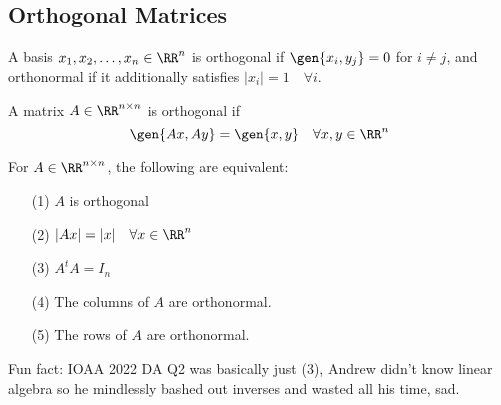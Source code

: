 \subsection{Orthogonal Matrices}

\begin{definition}

A basis $x_1, x_2, \hdots, x_n\in \RR^n$ is \ac{orthogonal} if $\gen{x_i, y_j} = 0$ for $i\neq j$, and \ac{orthonormal} if it additionally satisfies $\vert x_i\vert = 1\quad \forall i$. 
\end{definition}

\begin{definition}

A matrix $A\in \RR^{n\times n}$ is \ac{orthogonal} if 
\[\gen{Ax, Ay} = \gen{x,y}\quad \forall x,y\in \RR^n\]
\end{definition}

\begin{theorem}
\thmlabel

For $A\in \RR^{n\times n}$, the following are equivalent: 
\begin{itemize}
    \item [(1)] $A$ is orthogonal
    \item [(2)] $\vert Ax\vert = \vert x\vert\quad \forall x\in \RR^n$ 
    \item [(3)] $A^tA = I_n$
    \item [(4)] The columns of $A$ are orthonormal. 
    \item [(5)] The rows of $A$ are orthonormal. 
\end{itemize}
\end{theorem}

Fun fact: IOAA 2022 DA Q2 was basically just (3), Andrew didn't know linear algebra so he mindlessly bashed out inverses and wasted all his time, sad. 

